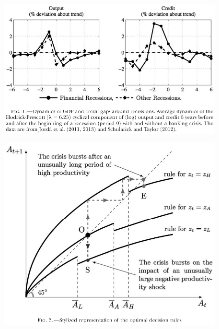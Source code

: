 \documentclass{beamer}
\begin{document}
\begin{frame}
  \begin{figure}
    \includegraphics[scale=.7]{boissay.eps}
  \end{figure}
\end{frame}

\begin{frame}
  \begin{figure}
    \includegraphics[scale=.7]{boissay2.eps}
  \end{figure}
\end{frame}
\end{document}
